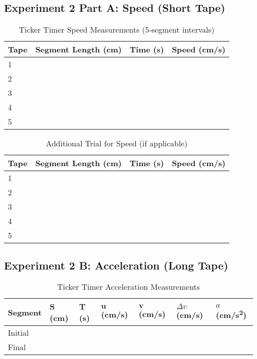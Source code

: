 \documentclass{tufte-handout}
\begin{document}
\subsection{Experiment 2 Part A: Speed (Short Tape)}
\FloatBarrier
\begin{table}[ht]
\centering
\caption{Ticker Timer Speed Measurements (5‐segment intervals)}
\begin{tabular}{@{}llll@{}}
\toprule
\textbf{Tape} &
\textbf{Segment Length (cm)} &
\textbf{Time (s)} &
\textbf{Speed (cm/s)} \\
\midrule
1 &  &  &  \\
2 &  &  &  \\
3 &  &  &  \\
4 &  &  &  \\
5 &  &  &  \\
\bottomrule
\end{tabular}
\end{table}

\begin{table}[ht]
\centering
\caption{Additional Trial for Speed (if applicable)}
\begin{tabular}{@{}llll@{}}
\toprule
\textbf{Tape} &
\textbf{Segment Length (cm)} &
\textbf{Time (s)} &
\textbf{Speed (cm/s)} \\
\midrule
1 &  &  &  \\
2 &  &  &  \\
3 &  &  &  \\
4 &  &  &  \\
5 &  &  &  \\
\bottomrule
\end{tabular}
\end{table}
\FloatBarrier

\subsection{Experiment 2 B: Acceleration (Long Tape)}
\FloatBarrier
\begin{table}[ht]
\centering
\caption{Ticker Timer Acceleration Measurements}
\begin{tabular}{@{}lllllll@{}}
\toprule
\textbf{Segment} &
\textbf{S (cm)} &
\textbf{T (s)} &
$\boldsymbol{u}$ (\si{cm/s}) &
$\boldsymbol{v}$ (\si{cm/s}) &
$\Delta v$ (\si{cm/s}) &
$a$ (\si{cm/s^2}) \\
\midrule
Initial &  &  &  &  &  &  \\
Final   &  &  &  &  &  &  \\
\bottomrule
\end{tabular}
\end{table}
\FloatBarrier
\end{document}
